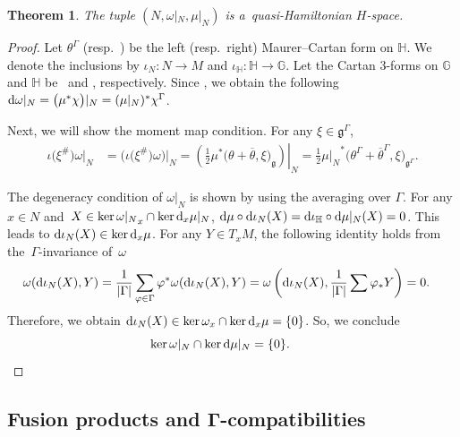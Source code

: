 \documentclass[10pt,a4paper]{amsart}
\numberwithin{equation}{section}
\newtheorem{Theorem}{Theorem}[section]
\theoremstyle{definition}
\newcommand{\bG}{\mathbb{G}}
\newcommand{\bH}{\mathbb{H}}
\begin{document}
\begin{Theorem}\label{fixed_points_q-Ham}
 The tuple $(N, \omega|_N, \mu|_N)$ is a~quasi-Hamiltonian $H$-space.
\end{Theorem}

\begin{proof}Let $\theta^{\Gamma}$ (resp.\ \smash{$\overline{\theta}^{\Gamma}$}) be the left (resp.\ right) Maurer--Cartan form on $\bH$.
 We denote the inclusions by $\iota_N \colon N \to M$ and $\iota_{\bH} \colon \bH \to \bG $.
Let the Cartan $3$-forms on $\bG$ and $\bH$ be~
 and ,
 respectively.
 Since \smash{$\chi^{\Gamma} = \chi |_{\bH}$}, we obtain the following $
 {\rm d}\omega|_N
 = \bigl(\mu^{*}\chi\bigr)|_{N}
 = (\mu|_N)^* \chi^{\Gamma}$.

Next, we will show the moment map condition.
 For any $\xi \in \mathfrak{g}^{\Gamma}$,
 \begin{align*}
 \iota\bigl(\xi^{\#}\bigr)\omega|_N &= \bigl(\iota\bigl(\xi^{\#}\bigr)\omega\bigr)|_{N} = \left.\left( \frac{1}{2} \mu^*\bigl(\theta + \overline{\theta},\xi \bigr) _{\mathfrak{g}}\right)\right| _{N} = \frac{1}{2}{\mu|_N}^*\bigl(\theta^{\Gamma}+\overline{\theta}^{\Gamma},\xi\bigr)_{\mathfrak{g}^{\Gamma}}.
 \end{align*}

 The degeneracy condition of $\omega|_N$ is shown by using the averaging over $\Gamma$.
 For any $x \in N$ and~${X \in \ker{\omega|_N}_x \cap \ker {\rm d}_{x}\mu|_N}$,
${\rm d}\mu \circ {\rm d}\iota_{N}(X) = {\rm d}\iota_{\bH} \circ {\rm d} \mu|_N(X)= 0$.
 This leads to ${\rm d}\iota_{N}(X) \in \ker {\rm d}_{x}\mu$.
 For any $Y \in T_xM$, the following identity holds from the~$\Gamma$-invariance of~$\omega$
 \begin{align*}
 \omega ({\rm d}\iota_{N}(X), Y) &= \frac{1}{|\Gamma|}\sum_{\varphi \in \Gamma} \varphi^*\omega({\rm d}\iota_{N}(X),Y) = \omega\left({\rm d}\iota_{N}(X), \frac{1}{|\Gamma|}\sum \varphi_*Y\right) =0.
 \end{align*}
Therefore, we obtain ${\rm d}\iota_{N}(X) \in \ker \omega_x \cap \ker {\rm d}_x \mu = \{0\}$.
So, we conclude
\[
\ker\omega|_N \cap \ker {\rm d}\mu|_N =\{0\}.\tag*{\qed}
\]\renewcommand{\qed}{}
\end{proof}

\subsection[Fusion products and G-compatibilities]{Fusion products and $\boldsymbol{\Gamma}$-compatibilities}
\end{document}
